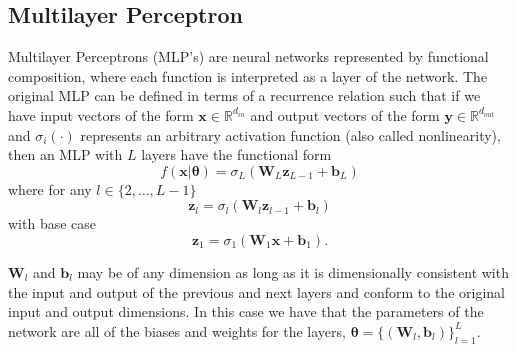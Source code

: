 \subsection{Multilayer Perceptron}
Multilayer Perceptrons (MLP's) are neural networks represented by functional composition, where each
function is interpreted as a layer of the network. The original MLP can be defined in
terms of a recurrence relation such that if we have input vectors of the form $\bm{x} \in
\mathbb{R}^{d_{in}}$ and output vectors of the form $\bm{y} \in
\mathbb{R}^{d_{out}}$ and $\sigma_i( \cdot )$ represents an arbitrary activation
function (also called nonlinearity), then an MLP with $L$ layers have the functional form
\begin{equation}
  f(\bm{x} | \bm{\theta}) = \sigma_L(\bm{W}_L \bm{z}_{L-1} + \bm{b}_{L})
\end{equation}
where for any $l \in \{2, \dots, L-1\}$
\begin{equation}
    \bm{z}_l = \sigma_l(\bm{W}_l \bm{z}_{l-1} + \bm{b}_l)
\end{equation}
with base case
\begin{equation}
  \bm{z}_1 = \sigma_1(\bm{W}_1 \bm{x} + \bm{b}_1).
\end{equation} \cite{BarberAppliedML}

$\bm{W}_l$ and $\bm{b}_l$ may be of any dimension as long as it is dimensionally consistent
with the input and output of the previous and next layers and conform to the
original input and output dimensions. In this case we have that the parameters
of the network are all of the biases and weights for the layers, $\bm{\theta} =
\{(\bm{W}_l, \bm{b}_l)\}_{l = 1}^L$.

